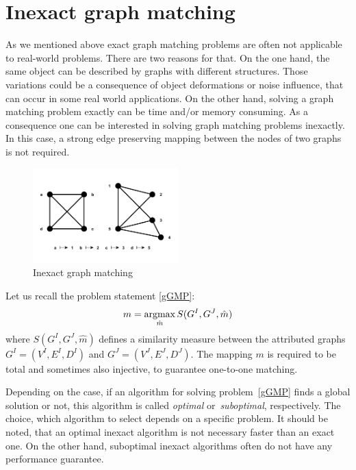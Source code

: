 \section{Inexact graph matching}
As we mentioned above exact graph matching problems are often not applicable to real-world problems. There are two reasons for that. %
On the one hand, the same object can be described by graphs with different structures. Those variations could be a consequence of object deformations or noise influence, that can occur in some real world applications. On the other hand, solving a graph matching problem exactly can be time and/or memory consuming. As a consequence one can be interested in solving graph matching problems inexactly. In this case, a strong edge preserving mapping between the nodes of two graphs is not required.

\vspace{-12pt}
\begin{figure}[htb]
	\centering
	\includegraphics[width=0.5\textwidth]{chapter1/fig/inexactGM}
    \caption{Inexact graph matching}
    \label{fig:inexact_GM}
\end{figure}
\vspace{-10pt}
Let us recall the problem statement \eqref{gGMP}: 
\begin{equation*}
m = \mathop{\rm argmax}_{\hat{m}}S(G^I, G^J, \hat{m})
\end{equation*}
where $S(G^I, G^J, \hat{m})$ defines a similarity measure between the attributed graphs $G^I = (V^I, E^I,D^I)$ and $G^J = (V^J, E^J,D^J)$. The mapping $m$ is required to be total and sometimes also injective, to guarantee one-to-one matching.

Depending on the case, if an algorithm for solving problem~\eqref{gGMP} finds a global solution or not, this algorithm is called \emph{optimal} or~\emph{suboptimal}, respectively. The choice, which algorithm to select depends on a specific problem. It should be noted, that an optimal inexact algorithm is not necessary faster than an exact one. On the other hand, suboptimal inexact algorithms often do not have any performance guarantee.

